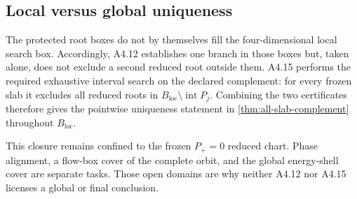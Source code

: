 \subsection{Local versus global uniqueness}

The protected root boxes do not by themselves fill the four-dimensional
local search box.  Accordingly, A4.12 establishes one branch in those boxes
but, taken alone, does not exclude a second reduced root outside them.  A4.15
performs the required exhaustive interval search on the declared complement:
for every frozen slab it excludes all reduced roots in
\(B_{\mathrm{loc}}\setminus\operatorname{int}P_j\).  Combining the two
certificates therefore gives the pointwise uniqueness statement in
\cref{thm:all-slab-complement} throughout \(B_{\mathrm{loc}}\).

This closure remains confined to the frozen \(P_+=0\) reduced chart.  Phase
alignment, a flow-box cover of the complete orbit, and the global
energy-shell cover are separate tasks.  Those open domains are why neither
A4.12 nor A4.15 licenses a global or final conclusion.
